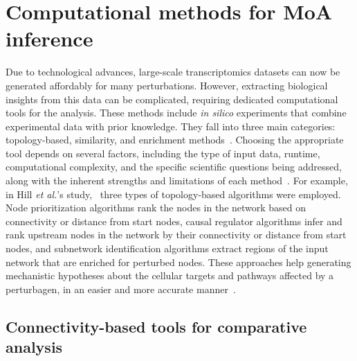 \section{Computational methods for MoA inference} %
\label{sec:Computational_methods_for_MoA_inference}

Due to technological advances, large-scale transcriptomics datasets can now be generated affordably for many perturbations. 
However, extracting biological insights from this data can be complicated, requiring dedicated computational tools for the analysis. 
These methods include \textit{in silico} experiments that combine experimental data with prior knowledge. 
They fall into three main categories: topology-based, similarity, and enrichment methods~\cite{RN57, RN56}. 
Choosing the appropriate tool depends on several factors, including the type of input data, runtime, computational complexity, and the specific scientific questions being addressed, along with the inherent strengths and limitations of each method~\cite{RN38}. 
For example, in Hill \textit{et al.}'s study,~\cite{RN37} three types of topology-based algorithms were employed. 
Node prioritization algorithms rank the nodes in the network based on connectivity or distance from start nodes, causal regulator algorithms infer and rank upstream nodes in the network by their connectivity or distance from start nodes, and subnetwork identification algorithms extract regions of the input network that are enriched for perturbed nodes. 
These approaches help generating mechanistic hypotheses about the cellular targets and pathways affected by a perturbagen, in an easier and more accurate manner~\cite{RN100}. 

\subsection{Connectivity-based tools for comparative analysis} %
\label{sub:connectivity-based_methods}

